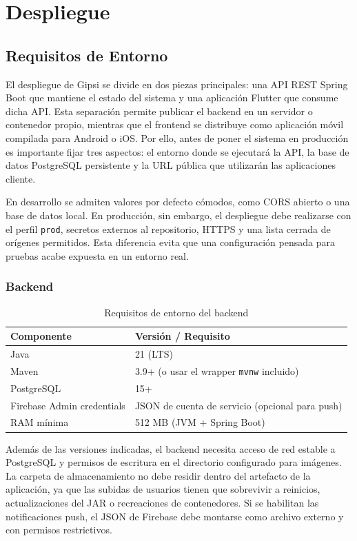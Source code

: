 \documentclass[12pt,a4paper,twoside]{report}
\begin{document}
\chapter{Despliegue}

\section{Requisitos de Entorno}

El despliegue de Gipsi se divide en dos piezas principales: una API REST
Spring Boot que mantiene el estado del sistema y una aplicación Flutter que
consume dicha API. Esta separación permite publicar el backend en un servidor
o contenedor propio, mientras que el frontend se distribuye como aplicación
móvil compilada para Android o iOS. Por ello, antes de poner el sistema en
producción es importante fijar tres aspectos: el entorno donde se ejecutará la
API, la base de datos PostgreSQL persistente y la URL pública que utilizarán
las aplicaciones cliente.

En desarrollo se admiten valores por defecto cómodos, como CORS abierto o una
base de datos local. En producción, sin embargo, el despliegue debe realizarse
con el perfil \texttt{prod}, secretos externos al repositorio, HTTPS y una
lista cerrada de orígenes permitidos. Esta diferencia evita que una
configuración pensada para pruebas acabe expuesta en un entorno real.

\subsection{Backend}

\begin{table}[H]
\centering
\caption{Requisitos de entorno del backend}
\label{tab:req-backend}
\begin{tabular}{ll}
\toprule
Componente & Versión / Requisito \\
\midrule
Java & 21 (LTS) \\
Maven & 3.9+ (o usar el wrapper \texttt{mvnw} incluido) \\
PostgreSQL & 15+ \\
Firebase Admin credentials & JSON de cuenta de servicio (opcional para push) \\
RAM mínima & 512 MB (JVM + Spring Boot) \\
\bottomrule
\end{tabular}
\end{table}

Además de las versiones indicadas, el backend necesita acceso de red estable a
PostgreSQL y permisos de escritura en el directorio configurado para imágenes.
La carpeta de almacenamiento no debe residir dentro del artefacto de la
aplicación, ya que las subidas de usuarios tienen que sobrevivir a reinicios,
actualizaciones del JAR o recreaciones de contenedores. Si se habilitan las
notificaciones push, el JSON de Firebase debe montarse como archivo externo y
con permisos restrictivos.
\end{document}
